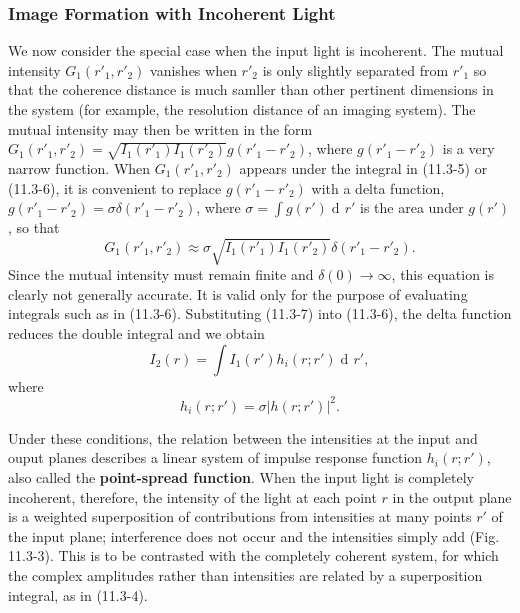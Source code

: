 \documentclass{article}
\numberwithin{figure}{subsection}
\numberwithin{table}{subsection}
\DeclareMathOperator\dif{d\!}
\begin{document}
\bigbreak\begingroup
\color{ksc}
\subsubsection{Image Formation with Incoherent Light}
\endgroup
We now consider the special case when the input light is incoherent. The mutual intensity $G_1 (r'_1, r'_2)$ vanishes when $r'_2$ is only slightly separated from $r'_1$ so that the coherence distance is much samller than other pertinent dimensions in the system (for example, the resolution distance of an imaging system). The mutual intensity may then be written in the form $G_1 (r'_1, r'_2) = \sqrt{I_1 (r'_1) I_1(r'_2)} g(r'_1 - r'_2)$, where $g(r'_1 - r'_2)$ is a very narrow function. When $G_1 (r'_1, r'_2)$ appears under the integral in (11.3-5) or (11.3-6),  it is convenient to replace $g(r'_1 - r'_2)$ with a delta function, $g(r'_1 - r'_2) = \sigma \delta (r'_1 - r'_2)$, where $\sigma = \int g(r') \dif r'$ is the area under $g(r')$, so that
\begin{equation}
G_1 (r'_1, r'_2) \approx \sigma \sqrt{I_1 (r'_1) I_1 (r'_2)} \delta (r'_1 - r'_2) .
\end{equation}
Since the mutual intensity must remain finite and $\delta (0) \to \infty$, this equation is clearly not generally accurate. It is valid only for the purpose of evaluating integrals such as in (11.3-6). Substituting (11.3-7) into (11.3-6), the delta function reduces the double integral and we obtain 
\begin{equation}
I_2 (r) = \int I_1 (r') h_i (r; r') \dif r' ,
\end{equation}
where
\begin{equation}
h_i (r; r') = \sigma \lvert h(r; r') \rvert ^2 .
\end{equation}
\par Under these conditions, the relation between the intensities at the input and ouput planes describes a linear system of impulse response function $h_i (r; r')$, also called the \textbf{point-spread function}. When the input light is completely incoherent, therefore, the intensity of the light at each point $r$ in the output plane is a weighted superposition of contributions from intensities at many points $r'$ of the input plane; interference does not occur and the intensities simply add (Fig. 11.3-3). This is to be contrasted with the completely coherent system, for which the complex amplitudes rather than intensities are related by a superposition integral, as in (11.3-4).
\end{document}
